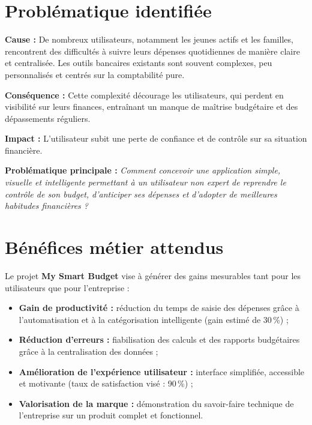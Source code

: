 
\section{Problématique identifiée}

\begin{tcolorbox}[colback=red!5!white,colframe=red!60!black,title=\textbf{Problématique reformulée}]
\textbf{Cause :} De nombreux utilisateurs, notamment les jeunes actifs et les familles, rencontrent des difficultés à suivre leurs dépenses quotidiennes de manière claire et centralisée.  
Les outils bancaires existants sont souvent complexes, peu personnalisés et centrés sur la comptabilité pure.

\textbf{Conséquence :} Cette complexité décourage les utilisateurs, qui perdent en visibilité sur leurs finances, entraînant un manque de maîtrise budgétaire et des dépassements réguliers.

\textbf{Impact :} L’utilisateur subit une perte de confiance et de contrôle sur sa situation financière.

\textbf{Problématique principale :}  
\textit{Comment concevoir une application simple, visuelle et intelligente permettant à un utilisateur non expert de reprendre le contrôle de son budget, d’anticiper ses dépenses et d’adopter de meilleures habitudes financières ?}
\end{tcolorbox}


\section{Bénéfices métier attendus}

\begin{tcolorbox}[colback=blue!5!white,colframe=blue!60!black,title=\textbf{Analyse des gains et bénéfices attendus}]
Le projet \textbf{My Smart Budget} vise à générer des gains mesurables tant pour les utilisateurs que pour l’entreprise :
\begin{itemize}
    \item \textbf{Gain de productivité :} réduction du temps de saisie des dépenses grâce à l’automatisation et à la catégorisation intelligente (gain estimé de 30\,\%) ;
    \item \textbf{Réduction d’erreurs :} fiabilisation des calculs et des rapports budgétaires grâce à la centralisation des données ;
    \item \textbf{Amélioration de l’expérience utilisateur :} interface simplifiée, accessible et motivante (taux de satisfaction visé : 90\,\%) ;
    \item \textbf{Valorisation de la marque :} démonstration du savoir-faire technique de l’entreprise sur un produit complet et fonctionnel.
\end{itemize}
\end{tcolorbox}

